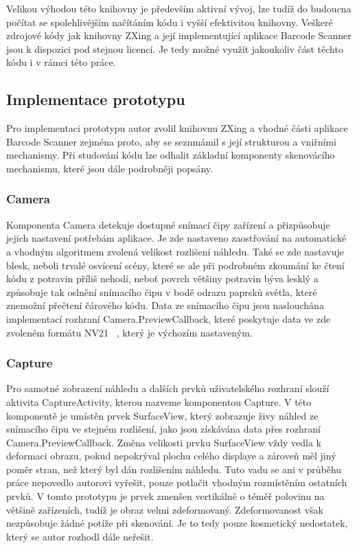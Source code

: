 \documentclass[thesis=B,czech]{FITthesis}[2013/10/20]
\begin{document}
Velikou výhodou této knihovny je především aktivní vývoj, lze tudíž do budoucna počítat se spolehlivějším načítáním kódu i vyšší efektivitou knihovny. Veškeré zdrojové kódy jak knihovny ZXing a její implementující aplikace Barcode Scanner jsou k dispozici pod stejnou licencí. Je tedy možné využít jakoukoliv část těchto kódu i v rámci této práce. 

\subsection{Implementace prototypu}

Pro implementaci prototypu autor zvolil knihovnu ZXing a vhodné části aplikace Barcode Scanner zejména proto, aby se seznmámil s její strukturou a vniřními mechanismy. Při studování kódu lze odhalit základní komponenty skenovácího mechanismu, které jsou dále podrobněji popsány.

\subsubsection{Camera}

Komponenta Camera detekuje dostupné snímací čipy zařízení a přizpůsobuje jejich nastavení potřebám aplikace. Je zde nastaveno zaostřování na automatické a vhodným algoritmem zvolená velikost rozlišení náhledu. Také se zde nastavuje blesk, neboli trvalé osvícení scény, které se ale při podrobném zkoumání ke čtení kódu z potravin příliš nehodí, neboť povrch většiny potravin býva lesklý a způsobuje tak oslnění snímacího čipu v bodě odrazu paprsků světla, které znemožní přečtení čárového kódu. Data ze snímacího čipu jsou naslouchána implementací rozhraní Camera.PreviewCallback, které poskytuje data ve zde zvoleném formátu NV21 ~\cite{nv21}, který je výchozím nastaveným.

\subsubsection{Capture}

Pro samotné zobrazení náhledu a dalších prvků uživatelského rozhraní slouží aktivita CaptureActivity, kterou nazveme komponentou Capture. V této komponentě je umístěn prvek SurfaceView, který zobrazuje živy náhled ze snímacího čipu ve stejném rozlišení, jako jsou získávána data přes rozhraní Camera.PreviewCallback. Změna velikosti prvku SurfaceView vždy vedla k deformaci obrazu, pokud nepokrýval plochu celého displaye a zároveň měl jiný poměr stran, než který byl dán rozlišením náhledu. Tuto vadu se ani v průběhu práce nepovedlo autorovi vyřešit, pouze potlačit vhodným rozmístěním ostatních prvků. V tomto prototypu je prvek zmenšen vertikálně o téměř polovinu na většině zařízeních, tudíž je obraz velmi zdeformovaný. Zdeformovanost však nezpůsobuje žádné potíže při skenování. Je to tedy pouze kosmetický nedostatek, který se autor rozhodl dále neřešit.
\end{document}
